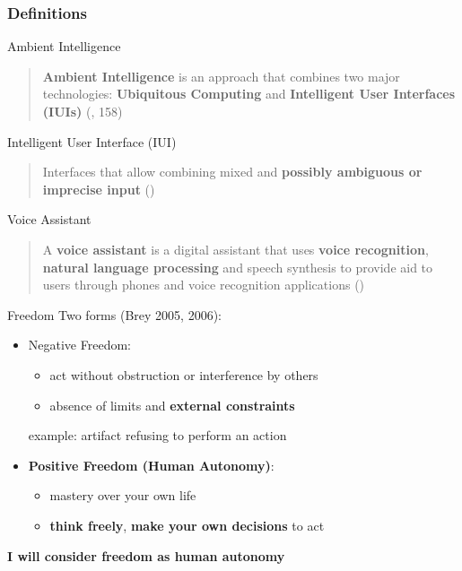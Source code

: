 \documentclass{beamer}
\begin{document}
\begin{frame}[allowframebreaks]
\frametitle{Definitions}	
	\begin{block}{Ambient Intelligence}
		\begin{quote}
			\textbf{Ambient Intelligence} is an approach that combines two major technologies: \textbf{Ubiquitous Computing} and \textbf{Intelligent User Interfaces (IUIs)} (\cite{brey2005freedom}, 158)
		\end{quote}
	\end{block}

	\begin{block}{Intelligent User Interface (IUI)}
		\begin{quote}
			Interfaces that allow combining mixed and \textbf{possibly ambiguous or imprecise input} (\cite{brey2005freedom})
		\end{quote}
	\end{block}

	\begin{block}{Voice Assistant}
		\begin{quote}
			A \textbf{voice assistant} is a digital assistant that uses \textbf{voice recognition}, \textbf{natural language processing} and speech synthesis to provide aid to users through phones and voice recognition applications (\cite{whatis})
		\end{quote}
	\end{block}
	\framebreak
	\begin{block}{Freedom}
		   Two forms (Brey 2005, 2006):
		   
			\begin{itemize}
				\item Negative Freedom:
					\begin{itemize}
						\item act without obstruction or interference by others
						\item absence of limits and \textbf{external constraints}
					\end{itemize}
				\smallskip
				example: artifact refusing to perform an action
				    \bigskip
					\item {\small \textbf{Positive Freedom (Human Autonomy)}:}
						\begin{itemize}
							\item mastery over your own life
							\item \textbf{think freely}, \textbf{make your own decisions} to act
						\end{itemize}
			\end{itemize}
		\bigskip
		\textbf{I will consider freedom as human autonomy}
		
	\end{block}
\end{frame}
\end{document}
